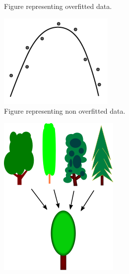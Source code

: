 \begin{figure}[ht]
\begin{subfigure}[b]{0.24\textwidth}
\caption{Figure representing overfitted data.}\label{fig:polymOverfit}
\end{subfigure}
\hfill
\begin{subfigure}[b]{0.24\textwidth}
\centering
\includegraphics[width=\textwidth]{polymNotOverfit}
\caption{Figure representing non overfitted data.}\label{fig:polymNotOverfit}
\end{subfigure}
\hfill
\begin{subfigure}[b]{0.24\textwidth}
\centering
\includegraphics[width=\textwidth]{GeneralizationTreesWikipedia}

\end{subfigure}
\end{figure}
